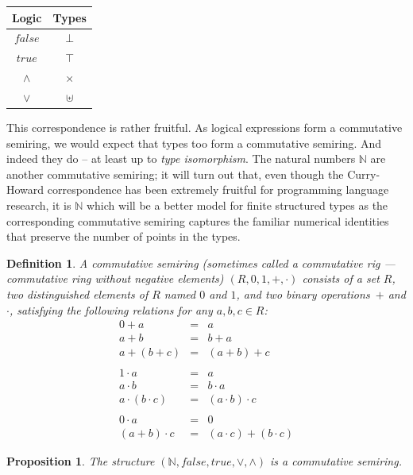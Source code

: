 \documentclass{article}
\newtheorem{defn}{Definition}[section]
\newtheorem{prop}{Proposition}[section]
\newcommand{\Nat}{\ensuremath{\mathbb{N}}}
\newcommand{\true}{\mathit{true}}
\newcommand{\false}{\mathit{false}}
\begin{document}
\begin{center}
\begin{tabular}{c|c}
Logic & Types \\ \hline
$\false$ & $\bot$ \\
$\true$ & $\top$ \\
$\land$ & $\times$ \\
$\lor$ & $\uplus$ \\
\end{tabular}
\end{center}

\noindent This correspondence is rather fruitful. As logical
expressions form a commutative semiring, we would expect that types
too form a commutative semiring. And indeed they do -- at least up to
\emph{type isomorphism}.  The natural numbers $\Nat$ are another
commutative semiring; it will turn out that, even though the
Curry-Howard correspondence has been extremely fruitful for
programming language research, it is $\Nat$ which will be a better
model for finite structured types as the corresponding commutative
semiring captures the familiar numerical identities that preserve the
number of points in the types.

\begin{defn}
\label{def:rig}
A \emph{commutative semiring} (sometimes called a \emph{commutative
  rig} --- commutative ri\emph{n}g without negative elements)
$(R,0,1,+,\cdot)$ consists of a set $R$, two distinguished elements of
$R$ named $0$ and $1$, and two binary operations~$+$ and $\cdot$,
satisfying the following relations for any $a,b,c \in R$:
\[\begin{array}{rcl}
0 + a &=& a \\
a + b &=& b + a \\
a + (b + c) &=& (a + b) + c \\
\\
1 \cdot a &=& a \\
a \cdot b &=& b \cdot a \\
a \cdot (b \cdot c) &=& (a \cdot b) \cdot c \\
\\
0 \cdot a &=& 0 \\
(a + b) \cdot c &=& (a \cdot c) + (b \cdot c)
\end{array}\]
\end{defn}

\begin{prop}
The structure $\left(\Nat, \false, \true, \lor, \land\right)$
is a commutative semiring.
\end{prop}
\end{document}
